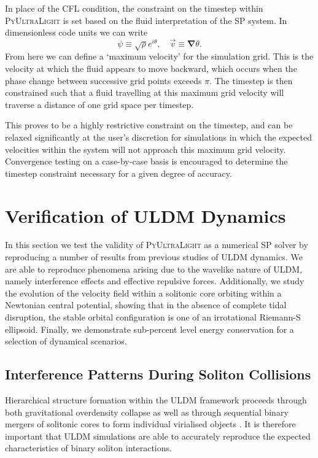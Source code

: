 \documentclass[a4paper,11pt]{article}
\newcommand{\PyUltraLight}{\textsc{PyUltraLight}\xspace}
\begin{document}
In place of the CFL condition, the constraint on the timestep within \PyUltraLight is set based on the fluid interpretation of the SP system. In dimensionless code units we can write 
\begin{equation}
    \psi\equiv\sqrt{\rho}e^{i\theta}, \quad \vec{v}\equiv\boldsymbol{\nabla}\theta.
\end{equation}
From here we can define a `maximum velocity' for the simulation grid. This is the velocity at which the fluid appears to move backward, which occurs when the phase change between successive grid points exceeds $\pi$. The timestep is then constrained such that a fluid travelling at this maximum grid velocity will traverse a distance of one grid space per timestep.

This proves to be a highly restrictive constraint on the timestep, and can be relaxed significantly at the user's discretion for simulations in which the expected velocities within the system will not approach this maximum grid velocity. Convergence testing on a case-by-case basis is encouraged to determine the timestep constraint necessary for a given degree of accuracy. 


\section{Verification of ULDM Dynamics}\label{sec:test}

In this section we test the validity of \PyUltraLight as a numerical SP solver by reproducing a number of results from previous studies of ULDM dynamics. We are able to reproduce phenomena arising due to the wavelike nature of ULDM, namely interference effects and effective repulsive forces. Additionally, we study the evolution of the velocity field within a solitonic core orbiting within a Newtonian central potential, showing that in the absence of complete tidal disruption, the stable orbital configuration is one of an irrotational Riemann-S ellipsoid. Finally, we demonstrate sub-percent level energy conservation for a selection of dynamical scenarios.

\subsection{Interference Patterns During Soliton Collisions}\label{sec:interference}

Hierarchical structure formation within the ULDM framework proceeds through both gravitational overdensity collapse as well as through sequential binary mergers of solitonic cores to form individual virialised objects \cite{Schive2014}. It is therefore important that ULDM simulations are able to accurately reproduce the expected characteristics of binary soliton interactions. 
\end{document}
